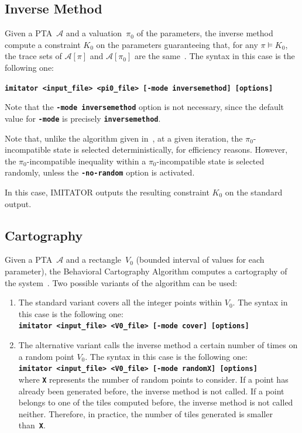 \documentclass[a4paper,11pt]{report}
\newcommand{\A}{\mathcal{A}}
\newcommand{\imitator}{\textsf{IMITATOR}}
\newcommand{\imitatorExec}{\code{imitator}}
\newcommand{\code}[1]{\textbf{\texttt{#1}}}
\begin{document}
\subsection{Inverse Method} \label{ss:mode_inversemethod}

Given a PTA~$\A$ and a valuation~$\pi_0$ of the parameters, the inverse method compute a constraint $K_0$ on the parameters guaranteeing that, for any $\pi \models K_0$, the trace sets of $\A[\pi]$ and $\A[\pi_0]$ are the same~\cite{AS13}.
The syntax in this case is the following one:

\code{\imitatorExec{} <input\_file> <pi0\_file> [-mode inversemethod] [options]}

Note that the \code{-mode inversemethod} option is not necessary, since the default value for \code{-mode} is precisely \code{inversemethod}.

Note that, unlike the algorithm given in~\cite{AS13}, at a given iteration, the $\pi_0$-incompatible state is selected deterministically, for efficiency reasons.
However, the $\pi_0$-incompatible inequality within a $\pi_0$-incompatible state is selected randomly, unless the \code{-no-random} option is activated.

In this case, \imitator{} outputs the resulting constraint $K_0$ on the standard output.


\subsection{Cartography} \label{ss:mode_cartography}

Given a PTA~$\A$ and a rectangle~$V_0$ (bounded interval of values for each parameter), the Behavioral Cartography Algorithm computes a cartography of the system~\cite{AF10}.
Two possible variants of the algorithm can be used:
\begin{enumerate}
	\item The standard variant covers all the integer points within $V_0$.
	The syntax in this case is the following one:\\
	\code{\imitatorExec{} <input\_file> <V0\_file> [-mode cover] [options]}

	\item The alternative variant calls the inverse method a certain number of times on a random point $V_0$.
	The syntax in this case is the following one:\\
	\code{\imitatorExec{} <input\_file> <V0\_file> [-mode randomX] [options]}\\
	where \code{X} represents the number of random points to consider.
	If a point has already been generated before, the inverse method is not called.
	If a point belongs to one of the tiles computed before, the inverse method is not called neither.
	Therefore, in practice, the number of tiles generated is smaller than~\code{X}.
\end{enumerate}
\end{document}

